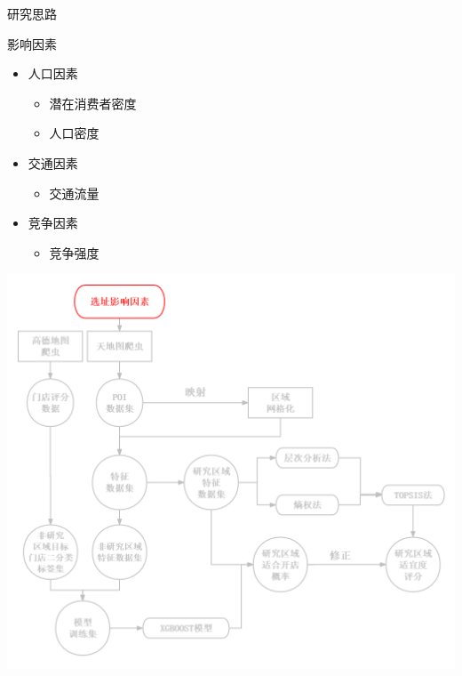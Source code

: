\documentclass{beamer}
\begin{document}
\begin{frame}{研究思路}   
    \begin{minipage}{0.37\textwidth}
        影响因素
        \begin{itemize}
            \item 人口因素
                \begin{itemize}
                    \item 潜在消费者密度
                    \item 人口密度
                \end{itemize}
            \item 交通因素
            \begin{itemize}
                \item 交通流量
            \end{itemize}
            \item 竞争因素
            \begin{itemize}
                \item 竞争强度
            \end{itemize}
        \end{itemize}
        
      \end{minipage}
      \hfill
      \begin{minipage}{0.6\textwidth}
        \includegraphics[width=1\textwidth]{pic/1.png}
      \end{minipage}
\end{frame}
\end{document}
